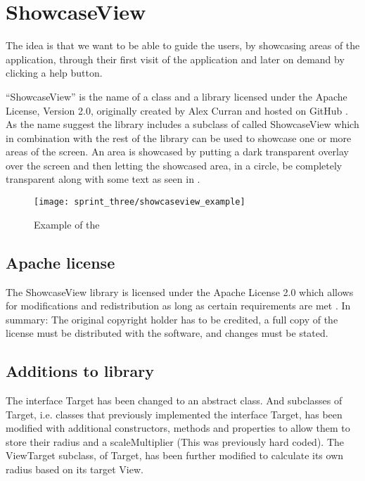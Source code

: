 
\section{ShowcaseView}
\label{sec:showcaseview}

The idea is that we want to be able to guide the users, by showcasing areas of the application, through their first visit of the application and later on demand by clicking a help button. 

``ShowcaseView'' is the name of a class and a library licensed under the Apache License, Version 2.0, originally created by Alex Curran and hosted on GitHub \parencite{showcaseview_by_alex_curran}. %
As the name suggest the library includes a subclass of  called ShowcaseView which in combination with the rest of the library can be used to showcase one or more areas of the screen. An area is showcased by putting a dark transparent overlay over the screen and then letting the showcased area, in a circle, be completely transparent along with some text as seen in .

\begin{figure}[!htbp]
    \centering
    \texttt{[image: sprint\_three/showcaseview\_example]}
    \caption{Example of the }
    \label{fig:showcaseview_example}
\end{figure}

\subsection{Apache license}

The ShowcaseView library is licensed under the Apache License 2.0 which allows for modifications and redistribution as long as certain requirements are met \parencite{apache2license}. In summary: The original copyright holder has to be credited, a full copy of the license must be distributed with the software, and changes must be stated.

\subsection{Additions to library}

The interface Target has been changed to an abstract class. And subclasses of Target, i.e. classes that previously implemented the interface Target, has been modified with additional constructors, methods and properties to allow them to store their radius and a scaleMultiplier (This was previously hard coded). The ViewTarget subclass, of Target, has been further modified to calculate its own radius based on its target View.  

